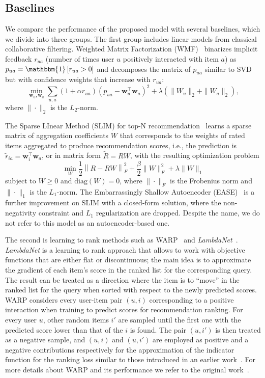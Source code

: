 \documentclass[sigconf,authorversion]{acmart}
\def\bw{{\bf w}}
\def\bw{\boldsymbol{w}}
\begin{document}
  
\subsection{Baselines}\label{sec:baselines}

We compare the performance of the proposed model with several baselines, which we divide into three groups. 
The first group includes linear models from classical collaborative filtering. Weighted Matrix Factorization (WMF)~\cite{hu2008collaborative} binarizes implicit feedback $r_{ua}$ (number of times user $u$ positively interacted with item $a$) as $p_{ua}=\mathbbm{1}\left[r_{ua}>0\right]$ and decomposes the matrix of $p_{ua}$ similar to SVD but with confidence weights that increase with $r_{ua}$:
\begin{equation}
    \min_{\bw_u,\bw_a}\sum_{u,a}(1+\alpha r_{ua})\left(p_{ua}-\bw_u^\top\bw_a\right)^2 + \lambda(\|W_u\|_2 + \|W_a\|_2),
\end{equation}
where $\|\cdot\|_2$ is the $L_2$-norm.

The Sparse LInear Method (SLIM) for top-N recommendation~\cite{ning2011slim} learns a sparse matrix of aggregation coefficients $W$ that corresponds to the weights of rated items aggregated to produce recommendation scores, i.e., the prediction is ${\tilde r}_{ia}=\bw_i^\top\bw_a$, or in matrix form ${\tilde R} = RW$, with the resulting optimization problem
\begin{equation}
\min_W\frac12\left\|R-RW\right\|^2_F+\frac{\beta}2\|W\|^2_F+\lambda\|W\|_1
\end{equation}
subject to $W\ge 0$ and $\mathrm{diag}(W)=0$, where $\|\cdot\|_F$ is the Frobenius norm and $\|\cdot\|_1$ is the $L_1$-norm. The Embarrassingly Shallow Autoencoder (EASE)~\cite{steck2019embarrassingly} is a further improvement on SLIM with a closed-form solution, where the non-negativity constraint and $L_1$ regularization are dropped. Despite the name, we do not refer to this model as an autoencoder-based one.

The second is learning to rank methods such as WARP~\cite{weston2011wsabie} and \emph{LambdaNet}~\cite{burges2007learning}. 
\emph{LambdaNet} is a learning to rank approach that allows to work with objective functions that are either flat or discontinuous; the main idea is to approximate the gradient of each item's score in the ranked list for the corresponding query. The result can be treated as a direction where the item is to ``move'' in the ranked list for the query when sorted with respect to the newly predicted scores. WARP considers every user-item pair $(u, i)$ corresponding to a positive interaction when training to predict scores for recommendation ranking. For every user $u$, other random items $i'$ are sampled until the first one with the predicted score lower than that of the $i$ is found. The pair $(u, i')$ is then treated as a negative sample, and $(u, i)$ and $(u, i')$ are employed as positive and a negative contributions respectively for the approximation of the indicator function for the ranking loss similar to those introduced in an earlier work~\cite{usunier2009ranking}. For more details about WARP and its performance we refer to the original work~\cite{weston2011wsabie}.
\end{document}
